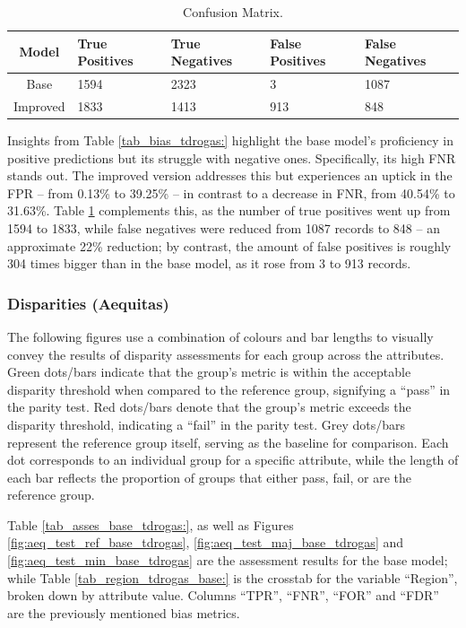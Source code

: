\documentclass[fleqn,10pt]{wlscirep}
\begin{document}
\begin{table}[!htb]
\centering
\begin{tabular}{|c|p{3cm}|p{3cm}|p{3cm}|p{3cm}|}
        \hline
        \textbf{Model} & \textbf{True Positives} & \textbf{True Negatives} & \textbf{False Positives} & \textbf{False Negatives}\\ \hline
        Base & 1594 & 2323 & 3 & 1087  \\ 
        Improved & 1833 & 1413 & 913 & 848  \\ 
        \hline
    \end{tabular}
\caption{Confusion Matrix.}
\label{tab_cm_tdrogas:}
\end{table}

Insights from Table \ref{tab_bias_tdrogas:} highlight the base model's proficiency in positive predictions but its struggle with negative ones. Specifically, its high FNR stands out. The improved version addresses this but experiences an uptick in the FPR -- from 0.13\% to 39.25\% -- in contrast to a decrease in FNR, from 40.54\% to 31.63\%. Table \ref{tab_cm_tdrogas:} complements this, as the number of true positives went up from 1594 to 1833, while false negatives were reduced from 1087 records to 848 -- an approximate 22\% reduction; by contrast, the amount of false positives is roughly 304 times bigger than in the base model, as it rose from 3 to 913 records.

\subsubsection{Disparities (Aequitas)}

The following figures use a combination of colours and bar lengths to visually convey the results of disparity assessments for each group across the attributes. Green dots/bars indicate that the group's metric is within the acceptable disparity threshold when compared to the reference group, signifying a ``pass'' in the parity test. Red dots/bars denote that the group's metric exceeds the disparity threshold, indicating a ``fail'' in the parity test. Grey dots/bars represent the reference group itself, serving as the baseline for comparison. Each dot corresponds to an individual group for a specific attribute, while the length of each bar reflects the proportion of groups that either pass, fail, or are the reference group. 

Table \ref{tab_asses_base_tdrogas:}, as well as Figures \ref{fig:aeq_test_ref_base_tdrogas}, \ref{fig:aeq_test_maj_base_tdrogas} and \ref{fig:aeq_test_min_base_tdrogas} are the assessment results for the base model; while Table \ref{tab_region_tdrogas_base:} is the crosstab for the variable ``Region'', broken down by attribute value. Columns ``TPR'', ``FNR'', ``FOR'' and ``FDR'' are the previously mentioned bias metrics.
\end{document}
